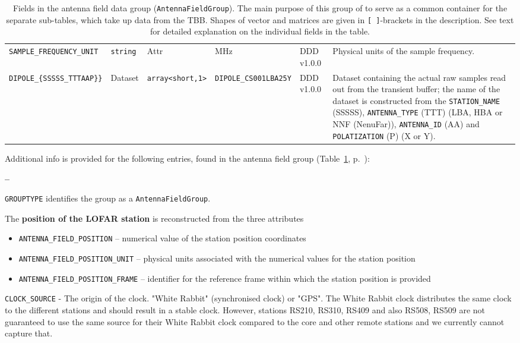 \documentclass[a4paper,10pt,bibtotoc]{scrartcl}
\begin{document}
\begin{landscape}
\begin{table}[htbp]
\begin{tabular}{|lllllp{5.5cm}|}
    \small {\texttt{SAMPLE\_FREQUENCY\_UNIT}} & \verb|string| & Attr & MHz & DDD v1.0.0 & Physical units of the sample frequency. \\
    \small {\texttt{DIPOLE\_\{SSSSS\_TTTAAP\}\}}} & Dataset & \verb|array<short,1>| & \texttt{DIPOLE\_CS001LBA25Y} & DDD v1.0.0 & Dataset containing the actual raw samples read out from the transient buffer; the name of the dataset is constructed from the \small \texttt{STATION\_NAME} (SSSSS), \verb|ANTENNA_TYPE| (TTT) (LBA, HBA or NNF (NenuFar)), \verb|ANTENNA_ID| (AA) and \verb|POLATIZATION| (P) (X or Y). \\
     \hline
  \end{tabular}
  \caption[Fields in the antenna field data group (\texttt{AntennaFieldGroup}).]{
    Fields in the antenna field data group (\texttt{AntennaFieldGroup}). The
    main purpose of this group of to serve as a common container for the separate
    sub-tables, which take up data from the TBB. Shapes of vector and matrices are given in
    \texttt{[ ]}-brackets in the description. See text for detailed explanation
    on the individual fields in the table.}
  \label{tab:antenna field group}
\end{table}
\end{landscape}

\newpage
Additional info is provided for the following entries, found in the antenna field group (Table~\ref{tab:antenna field group}, p.~\pageref{tab:antenna field group}):
\begin{list}{\textbf{--}}{}
\item \verb|GROUPTYPE| identifies the group as a \verb|AntennaFieldGroup|.
\item The \textbf{position of the LOFAR station} is reconstructed from the three
  attributes
  \begin{itemize} \parskip 0pt
  \item \verb|ANTENNA_FIELD_POSITION| -- numerical value of the station position
    coordinates
  \item \verb|ANTENNA_FIELD_POSITION_UNIT| -- physical units associated with the numerical
    values for the station position
  \item \verb|ANTENNA_FIELD_POSITION_FRAME| -- identifier for the reference frame within
    which the station position is provided
  \end{itemize}
\item \texttt{CLOCK\_SOURCE} - The origin of the clock.  "White Rabbit" (synchronised clock) or "GPS". The White Rabbit clock distributes the same clock to the different stations and should result in a stable clock. However, stations RS210, RS310, RS409 and also RS508, RS509 are not guaranteed to use the same source for their White Rabbit clock compared to the core and other remote stations and we currently cannot capture that. 
\end{list}
\end{document}
